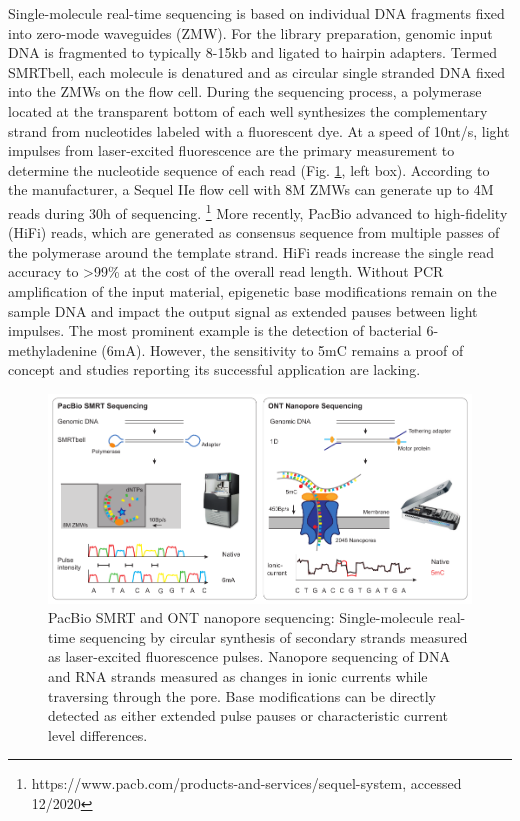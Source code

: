 Single-molecule real-time sequencing is based on individual DNA fragments fixed into zero-mode waveguides (ZMW).
For the library preparation, genomic input DNA is fragmented to typically 8-15kb and ligated to hairpin adapters.
Termed SMRTbell, each molecule is denatured and as circular single stranded DNA fixed into the ZMWs on the flow cell.
During the sequencing process, a polymerase located at the transparent bottom of each well synthesizes the complementary strand from nucleotides labeled with a fluorescent dye.
At a speed of 10nt/s, light impulses from laser-excited fluorescence are the primary measurement to determine the nucleotide sequence of each read (Fig. \ref{fig:intro:longread}, left box).
According to the manufacturer, a Sequel IIe flow cell with 8M ZMWs can generate up to 4M reads during 30h of sequencing. \footnote{https://www.pacb.com/products-and-services/sequel-system, accessed 12/2020}
More recently, PacBio advanced to high-fidelity (HiFi) reads, which are generated as consensus sequence from multiple passes of the polymerase around the template strand.
HiFi reads increase the single read accuracy to >99\% at the cost of the overall read length.
Without PCR amplification of the input material, epigenetic base modifications remain on the sample DNA and impact the output signal as extended pauses between light impulses.
The most prominent example is the detection of bacterial 6-methyladenine (6mA). 
However, the sensitivity to 5mC remains a proof of concept and studies reporting its successful application are lacking.

\begin{figure}[h]
	\centering
	\includegraphics[width=1.0\textwidth]{figures/intro/long_read.pdf}
	\captionsetup{format=plain}
	\caption[Long read sequencing]{PacBio SMRT and ONT nanopore sequencing: Single-molecule real-time sequencing by circular synthesis of secondary strands measured as laser-excited fluorescence pulses. Nanopore sequencing of DNA and RNA strands measured as changes in ionic currents while traversing through the pore. Base modifications can be directly detected as either extended pulse pauses or characteristic current level differences.}
	\label{fig:intro:longread}
\end{figure}

